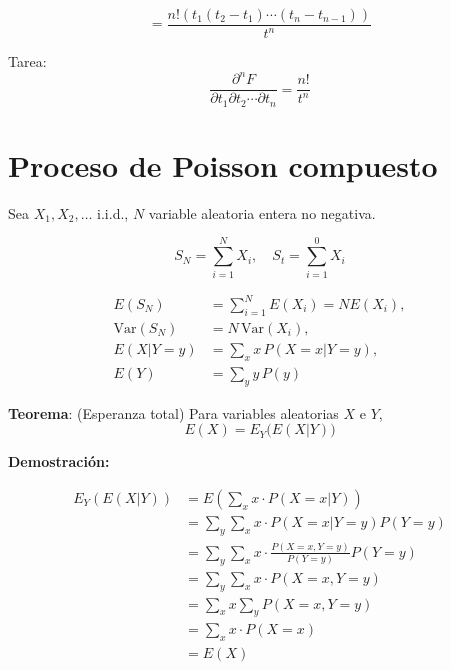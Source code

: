 \documentclass[12pt,a4paper]{article}
\newcommand{\teorema}[1]{%
\begin{teoremabox}
\textbf{Teorema}: #1
\end{teoremabox}
}
\begin{document}
\begin{equation*}
= \frac{n! (t_1(t_2-t_1)\cdots(t_n-t_{n-1}))}{t^n}
\end{equation*}

Tarea:
\begin{equation*}
\frac{\partial^n F}{\partial t_1 \partial t_2 \cdots \partial t_n} = \frac{n!}{t^n}
\end{equation*}





\section{Proceso de Poisson compuesto}

Sea $X_1, X_2, \ldots$ i.i.d., $N$ variable aleatoria entera no negativa.

\begin{equation*}
  S_N = \sum_{i=1}^{N} X_i, \quad S_t = \sum_{i=1}^{0} X_i
\end{equation*}

\begin{align*}
E(S_N) &= \sum_{i=1}^{N} E(X_i) = N E(X_i), \\
\mathrm{Var}(S_N) &= N\, \mathrm{Var}(X_i), \\
E(X|Y=y) &= \sum_{x} x\, P(X=x|Y=y), \\
E(Y) &= \sum_{y} y\, P(y)
\end{align*}


\teorema{(Esperanza total) Para variables aleatorias $X$ e $Y$,
\begin{equation*}
E(X) = E_Y\big(E(X|Y)\big)
\end{equation*}
}

\textbf{Demostración:}

\begin{align*}
E_Y(E(X|Y)) &= E\left(\sum_x x \cdot P(X=x|Y)\right) \\
&= \sum_y \sum_x x \cdot P(X=x|Y=y) P(Y=y) \\
&= \sum_y \sum_x x \cdot \frac{P(X=x, Y=y)}{P(Y=y)} P(Y=y) \\
&= \sum_y \sum_x x \cdot P(X=x, Y=y) \\
&= \sum_x x \sum_y P(X=x, Y=y) \\
&= \sum_x x \cdot P(X=x) \\
&= E(X)
\end{align*}
\end{document}

